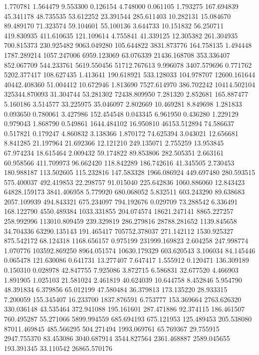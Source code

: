 1.770781
1.564479
9.553300
0.126154
4.748000
0.061105
1.793275
167.694839
45.341178
48.735535
53.612252
23.391544
285.611403
10.282131
15.084670
89.489170
71.323574
59.104601
55.100136
3.644733
10.151832
56.250711
419.830935
411.610635
121.109614
4.755841
41.339125
12.305382
261.304935
700.815373
230.925482
9063.049280
105.644822
3831.873776
164.758135
1.494448
1787.289214
1057.247006
6959.123069
63.076339
21436.168708
353.336407
852.067709
544.233761
5619.550456
51712.767613
9.996078
3407.579696
0.771762
5202.377417
108.627435
1.413641
190.618921
533.128033
104.978707
12600.161644
40442.408360
51.004412
10.672946
1.813690
7527.614970
386.702242
10414.502104
325344.870093
31.304744
53.281302
72438.809950
7.281320
2.852681
165.887477
5.160186
3.514577
33.225975
35.046097
2.802669
10.469281
8.849698
1.281833
0.093650
0.780061
3.427986
152.454548
0.043345
6.961950
0.436280
1.229129
0.979043
1.868790
0.549861
1644.484102
16.950810
46153.512894
74.586637
0.517821
0.179247
4.860832
3.138366
1.870172
74.625394
3.043021
12.656681
8.841285
21.197964
21.692366
12.121210
249.135071
2.755259
13.953845
67.974234
18.615464
2.009432
59.174822
89.853806
282.505351
2.663161
60.958566
411.709973
96.662420
118.842289
186.742616
41.345505
2.730453
180.988187
113.502605
115.232816
147.583328
1966.086924
449.697480
280.593515
575.400037
492.419853
22.298757
91.015040
225.642836
1060.886060
12.843423
64828.159173
3841.406958
5.779920
680.068052
5.832511
603.243290
89.638683
2057.109939
494.843321
675.234097
794.192676
0.029709
73.288542
6.336491
168.122790
4550.489384
1033.331855
204.074574
18621.247141
8865.227257
258.992996
113010.809459
239.329819
286.279816
28788.281652
1139.845658
34.704336
63290.135143
191.465417
705752.378037
271.142112
1530.925327
875.542172
68.124318
1168.656157
0.975199
231999.169823
2.604258
247.998774
1.070776
103592.869250
8964.051574
10630.179329
603.620543
3.106034
84.145446
0.065478
121.630086
0.641731
13.277407
7.647417
1.555912
0.120471
136.309189
0.150310
0.028978
42.847755
7.925086
3.872715
6.586831
32.677520
4.466903
1.891905
1.025103
21.581024
2.461819
40.624039
10.644758
8.452846
5.954790
48.391834
6.379856
65.012199
47.580484
36.379813
173.135220
28.933315
7.200059
155.345407
16.233700
1837.876591
6.753777
153.369664
2763.626320
330.036148
43.535464
372.941088
195.161601
287.471886
92.374115
186.461507
760.495287
55.271066
5899.994559
685.694193
675.121953
125.489453
205.538080
87011.469845
485.566295
504.271494
1993.069761
65.769367
29.755915
2947.755370
83.453086
3040.687914
3544.827564
2361.468887
2589.045655
193.391345
33.110542
26865.570176
